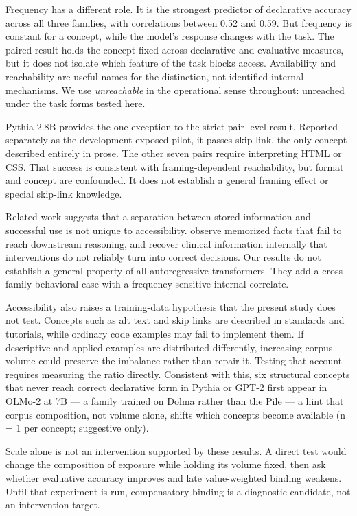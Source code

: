 \documentclass[
  english,
]{article}
\begin{document}
Frequency has a different role. It is the strongest predictor of declarative accuracy across all three families, with correlations between 0.52 and 0.59. But frequency is constant for a concept, while the model's response changes with the task. The paired result holds the concept fixed across declarative and evaluative measures, but it does not isolate which feature of the task blocks access. Availability and reachability are useful names for the distinction, not identified internal mechanisms. We use \emph{unreachable} in the operational sense throughout: unreached under the task forms tested here.

Pythia-2.8B provides the one exception to the strict pair-level result. Reported separately as the development-exposed pilot, it passes skip link, the only concept described entirely in prose. The other seven pairs require interpreting HTML or CSS. That success is consistent with framing-dependent reachability, but format and concept are confounded. It does not establish a general framing effect or special skip-link knowledge.

Related work suggests that a separation between stored information and successful use is not unique to accessibility. \citet{dai2026towards} observe memorized facts that fail to reach downstream reasoning, and \citet{basu2026interpretability} recover clinical information internally that interventions do not reliably turn into correct decisions. Our results do not establish a general property of all autoregressive transformers. They add a cross-family behavioral case with a frequency-sensitive internal correlate.

Accessibility also raises a training-data hypothesis that the present study does not test. Concepts such as alt text and skip links are described in standards and tutorials, while ordinary code examples may fail to implement them. If descriptive and applied examples are distributed differently, increasing corpus volume could preserve the imbalance rather than repair it. Testing that account requires measuring the ratio directly. Consistent with this, six structural concepts that never reach correct declarative form in Pythia or GPT-2 first appear in OLMo-2 at 7B --- a family trained on Dolma rather than the Pile --- a hint that corpus composition, not volume alone, shifts which concepts become available (n = 1 per concept; suggestive only).

Scale alone is not an intervention supported by these results. A direct test would change the composition of exposure while holding its volume fixed, then ask whether evaluative accuracy improves and late value-weighted binding weakens. Until that experiment is run, compensatory binding is a diagnostic candidate, not an intervention target.
\end{document}
